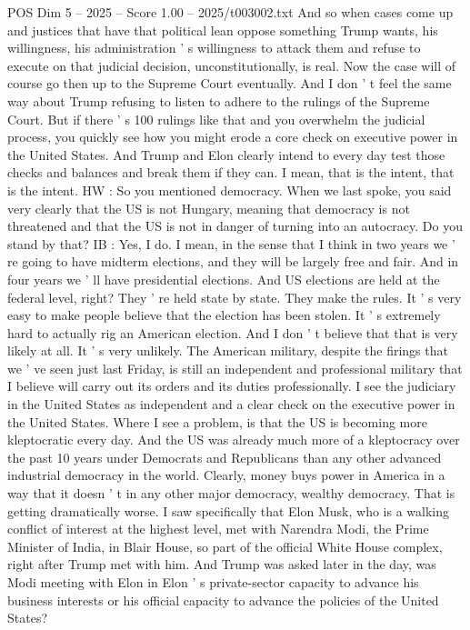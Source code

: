 \begin{textsample}{POS Dim 5 – 2025 – Score 1.00 – 2025/t003002.txt}
And so when cases come up and justices that have that political lean oppose something Trump wants, his willingness, his administration ' s willingness to attack them and refuse to execute on that judicial decision, unconstitutionally, is real.
Now the case will of course go then up to the Supreme Court eventually.
And I don ' t feel the same way about Trump refusing to listen to adhere to the rulings of the Supreme Court.
But if there ' s 100 rulings like that and you overwhelm the judicial process, you quickly see how you might erode a core check on executive power in the United States.
And Trump and Elon clearly intend to every day test those checks and balances and break them if they can.
I mean, that is the intent, that is the intent.
HW : So you mentioned democracy.
When we last spoke, you said very clearly that the US is not Hungary, meaning that democracy is not threatened and that the US is not in danger of turning into an autocracy.
Do you stand by that?
IB : Yes, I do.
I mean, in the sense that I think in two years we ' re going to have midterm elections, and they will be largely free and fair.
And in four years we ' ll have presidential elections.
And US elections are held at the federal level, right?
They ' re held state by state.
They make the rules.
It ' s very easy to make people believe that the election has been stolen.
It ' s extremely hard to actually rig an American election.
And I don ' t believe that that is very likely at all.
It ' s very unlikely.
The American military, despite the firings that we ' ve seen just last Friday, is still an independent and professional military that I believe will carry out its orders and its duties professionally.
I see the judiciary in the United States as independent and a clear check on the executive power in the United States.
Where I see a problem, is that the US is becoming more kleptocratic every day.
And the US was already much more of a kleptocracy over the past 10 years under Democrats and Republicans than any other advanced industrial democracy in the world.
Clearly, money buys power in America in a way that it doesn ' t in any other major democracy, wealthy democracy.
That is getting dramatically worse.
I saw specifically that Elon Musk, who is a walking conflict of interest at the highest level, met with Narendra Modi, the Prime Minister of India, in Blair House, so part of the official White House complex, right after Trump met with him.
And Trump was asked later in the day, was Modi meeting with Elon in Elon ' s private-sector capacity to advance his business interests or his official capacity to advance the policies of the United States?

\end{textsample}
